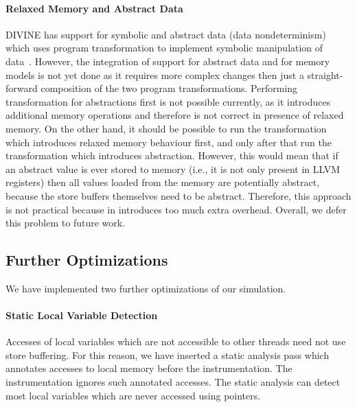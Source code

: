 \paragraph{Relaxed Memory and Abstract Data}
%
DIVINE has support for symbolic and abstract data (data nondeterminism) which
uses program transformation to implement symbolic manipulation of
data~.
However, the integration of support for abstract data and for memory models is
not yet done as it requires more complex changes then just a straight-forward
composition of the two program transformations.
Performing transformation for abstractions first is not possible currently, as
it introduces additional memory operations and therefore is not correct in
presence of relaxed memory.
On the other hand, it should be possible to run the transformation which
introduces relaxed memory behaviour first, and only after that run the
transformation which introduces abstraction.
However, this would mean that if an abstract value is ever stored to memory
(i.e., it is not only present in LLVM registers) then all values loaded from
the memory are potentially abstract, because the store buffers themselves need
to be abstract.
Therefore, this approach is not practical because in introduces too much extra
overhead.
Overall, we defer this problem to future work.

\subsection{Further Optimizations} \label{sec:mm:opt}

We have implemented two further optimizations of our \xtso simulation.

\paragraph{Static Local Variable Detection}
Accesses of local variables which are not accessible to other threads need not
use store buffering.  For this reason, we have inserted a static analysis pass
which annotates accesses to local memory before the \xtso instrumentation.  The
instrumentation ignores such annotated accesses.  The static analysis can
detect most local variables which are never accessed using pointers.



